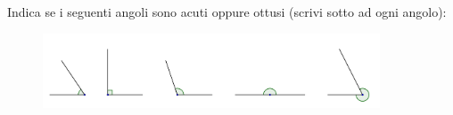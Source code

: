 \item Indica se i seguenti angoli sono acuti oppure ottusi (scrivi sotto ad ogni angolo):
\begin{figure}[h]
	\centering
		\includegraphics[width=10cm]{figure/angoli_ac_ott_TI.png}
\end{figure}